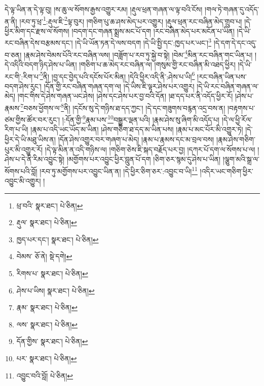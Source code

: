 དེ་ལྟ་ཡིན་ན་དེ་ལྟ་བུ། །ས་ཆུ་ལ་སོགས་རྒྱས་འགྱུར་རམ། །རྡུལ་ཕྲན་གཞན་ལ་ལྟ་བའི་ངོས། །གལ་ཏེ་གཞན་དུ་འདོད་ན་ནི། །རབ་ཏུ་ཕྲ་\footnote{ཕྲ་བའི་  སྣར་ཐང་།  པེ་ཅིན། }:རྡུལ་ཇི་\footnote{རྡུལ་  སྣར་ཐང་།  པེ་ཅིན། }ལྟ་བུར། །གཅིག་པུ་ཆ་ཤས་མེད་པར་འགྱུར། །རྡུལ་ཕྲན་རང་བཞིན་མེད་གྲུབ་པ། །དེ་ཕྱིར་མིག་དང་རྫས་ལ་སོགས། །བདག་དང་གཞན་སྨྲས་མང་པོ་དག །རང་བཞིན་མེད་པར་མངོན་པ་ཡིན། །དེ་ཡི་རང་བཞིན་དེས་བརྩམས་དང་། །དེ་ཡི་ཡོན་ཏན་དེ་ལས་བདག །དེ་ཡི་སྤྱི་དང་:ཁྱད་པར་ཡང་།\footnote{ཁྱད་པར་དང་།  སྣར་ཐང་།  པེ་ཅིན། } །དེ་དག་དེ་དང་འདུ་བ་ཅན། །རྣམ་ཤེས་བེམས་པོའི་རང་བཞིན་ལས། །བཟློག་པ་རབ་ཏུ་སྐྱེ་བ་སྟེ། །བེམ་\footnote{བེམས་  ཅོ་ནེ།  སྡེ་དགེ། }མིན་རང་བཞིན་གང་ཡིན་པ། །དེ་འདིའི་བདག་ཉིད་ཤེས་པ་ཡིན། །གཅིག་པ་ཆ་མེད་རང་བཞིན་ལ། །གསུམ་གྱི་རང་བཞིན་མི་འཐད་ཕྱིར། །དེ་ཡི་རང་གི་:རིག་པ་\footnote{རིགས་པ་  སྣར་ཐང་།  པེ་ཅིན། }ནི། །བྱ་དང་བྱེད་པའི་དངོས་པོར་མིན། །དེའི་ཕྱིར་འདི་ནི་:ཤེས་པ་ཡི།\footnote{ཤེས་པ་ཡིས།  སྣར་ཐང་།  པེ་ཅིན། } །རང་བཞིན་ཡིན་པས་བདག་ཤེས་རུང་། །དོན་གྱི་རང་བཞིན་གཞན་དག་ལ། །དེ་ཡིས་ཇི་ལྟར་ཤེས་པར་འགྱུར། །དེ་ཡི་རང་བཞིན་གཞན་ལ་མེད། །གང་གིས་དེ་ཤེས་གཞན་ཡང་ཤེས། །ཤེས་དང་ཤེས་པར་བྱ་བའི་དོན། །ཐ་དད་པར་ནི་འདོད་ཕྱིར་རོ། །ཤེས་པ་རྣམས་\footnote{རྣམ་  སྣར་ཐང་།  པེ་ཅིན། }བཅས་ཕྱོགས་ལ་\footnote{ལས་  སྣར་ཐང་།  པེ་ཅིན། }ནི། །དངོས་སུ་དེ་གཉིས་ཐ་དད་ཀྱང་། །དེ་དང་གཟུགས་བརྙན་འདྲ་བས་ན། །བརྟགས་པ་ཙམ་གྱིས་ཚོར་བར་རུང་། །:དོན་གྱི་\footnote{དོན་གྱིས་  སྣར་ཐང་།  པེ་ཅིན། }རྣམ་པས་\footnote{པར་  སྣར་ཐང་།  པེ་ཅིན། }བསྒྱུར་ལྡན་པའི། །རྣམ་ཤེས་སུ་ཞིག་མི་འདོད་པ། །དེ་ལ་ཕྱི་རོལ་རིག་པ་ཡི། །རྣམ་པ་འདི་ཡང་ཡོད་མ་ཡིན། །ཤེས་གཅིག་ཐ་དད་མ་ཡིན་པས། །རྣམ་པ་མང་པོར་མི་འགྱུར་ཏེ། །དེ་ཕྱིར་དེ་ཡི་མཐུ་ཡིས་ན། །དོན་ཤེས་འགྱུར་བར་གཞག་པ་མེད། །རྣམ་པ་རྣམས་དང་མ་བྲལ་བས། །རྣམ་ཤེས་གཅིག་པུར་མི་འགྱུར་རོ། །དེ་ལྟ་མིན་ན་འདི་གཉིས་ལ། །གཅིག་ཅེས་ཇི་སྐད་བརྗོད་པར་བྱ། །དཀར་པོ་དག་ལ་སོགས་པ་ལ། །ཤེས་པ་དེ་ནི་རིམ་འབྱུང་སྟེ། །མགྱོགས་པར་འབྱུང་ཕྱིར་བླུན་པོ་དག །ཅིག་ཅར་སྙམ་དུ་ཤེས་པ་ཡིན། །ལྕུག་མའི་སྒྲ་ལ་སོགས་པའི་བློ། །རབ་ཏུ་མགྱོགས་པར་འབྱུང་ཡིན་ན། །དེ་ཕྱིར་ཅིག་ཅར་:འབྱུང་བ་ཡི།\footnote{འབྱུང་བའི་བློ།  པེ་ཅིན། } །འདིར་ཡང་གཅིག་ཕྱིར་འབྱུང་མི་འགྱུར། །
